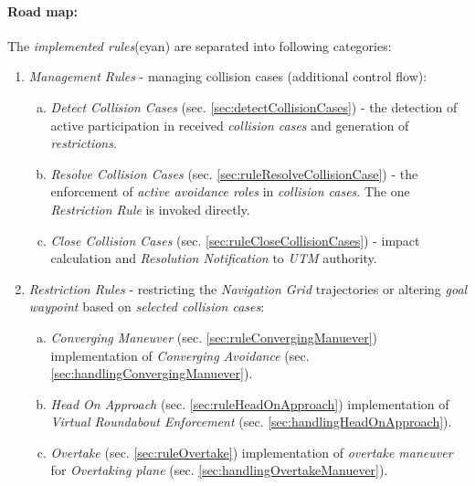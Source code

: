 \paragraph{Road map:} The \emph{implemented rules}(cyan) are separated into following categories:
\begin{enumerate}
    \item \emph{Management Rules} - managing collision cases (additional control flow):
        \begin{enumerate}[a.]
            
            \item \emph{Detect Collision Cases} (sec. \ref{sec:detectCollisionCases}) - the detection of active participation in received \emph{collision cases} and generation of \emph{restrictions}.
            
            \item \emph{Resolve Collision Cases} (sec. \ref{sec:ruleResolveCollisionCase}) - the enforcement of \emph{active avoidance roles} in \emph{collision cases}. The one \emph{Restriction Rule} is invoked directly.
            
            \item \emph{Close Collision Cases} (sec. \ref{sec:ruleCloseCollisionCases}) - impact calculation and \emph{Resolution Notification} to \emph{UTM} authority.
        \end{enumerate}
    
    \item \emph{Restriction Rules} - restricting the \emph{Navigation Grid} trajectories or altering \emph{goal waypoint} based on \emph{selected collision cases}:
    \begin{enumerate}[a.]
        \item \emph{Converging Maneuver} (sec. \ref{sec:ruleConvergingManuever}) implementation of \emph{Converging Avoidance} (sec. \ref{sec:handlingConvergingManuever}).
        
        \item \emph{Head On Approach} (sec. \ref{sec:ruleHeadOnApproach}) implementation of \emph{Virtual Roundabout Enforcement} (sec. \ref{sec:handlingHeadOnApproach}).
        
        \item \emph{Overtake} (sec. \ref{sec:ruleOvertake}) implementation of \emph{overtake maneuver} for \emph{Overtaking plane} (sec. \ref{sec:handlingOvertakeManuever}).
    \end{enumerate}
    

\end{enumerate}
